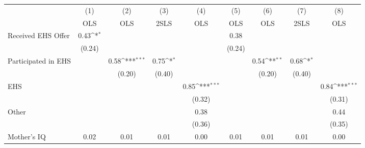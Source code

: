 {
\def\sym#1{\ifmmode^{#1}\else\(^{#1}\)\fi}
\begin{tabular}{l*{8}{c}}
\hline\hline
                    &\multicolumn{1}{c}{(1)}&\multicolumn{1}{c}{(2)}&\multicolumn{1}{c}{(3)}&\multicolumn{1}{c}{(4)}&\multicolumn{1}{c}{(5)}&\multicolumn{1}{c}{(6)}&\multicolumn{1}{c}{(7)}&\multicolumn{1}{c}{(8)}\\
                    &\multicolumn{1}{c}{OLS}&\multicolumn{1}{c}{OLS}&\multicolumn{1}{c}{2SLS}&\multicolumn{1}{c}{OLS}&\multicolumn{1}{c}{OLS}&\multicolumn{1}{c}{OLS}&\multicolumn{1}{c}{2SLS}&\multicolumn{1}{c}{OLS}\\
\hline
Received EHS Offer  &        0.43\sym{*}  &                     &                     &                     &        0.38         &                     &                     &                     \\
                    &      (0.24)         &                     &                     &                     &      (0.24)         &                     &                     &                     \\
[1em]
Participated in EHS &                     &        0.58\sym{***}&        0.75\sym{*}  &                     &                     &        0.54\sym{**} &        0.68\sym{*}  &                     \\
                    &                     &      (0.20)         &      (0.40)         &                     &                     &      (0.20)         &      (0.40)         &                     \\
[1em]
EHS                 &                     &                     &                     &        0.85\sym{***}&                     &                     &                     &        0.84\sym{***}\\
                    &                     &                     &                     &      (0.32)         &                     &                     &                     &      (0.31)         \\
[1em]
Other               &                     &                     &                     &        0.38         &                     &                     &                     &        0.44         \\
                    &                     &                     &                     &      (0.36)         &                     &                     &                     &      (0.35)         \\
[1em]
Mother's IQ         &        0.02         &        0.01         &        0.01         &        0.00         &        0.01         &        0.01         &        0.01         &        0.00         \\

\end{tabular}}
